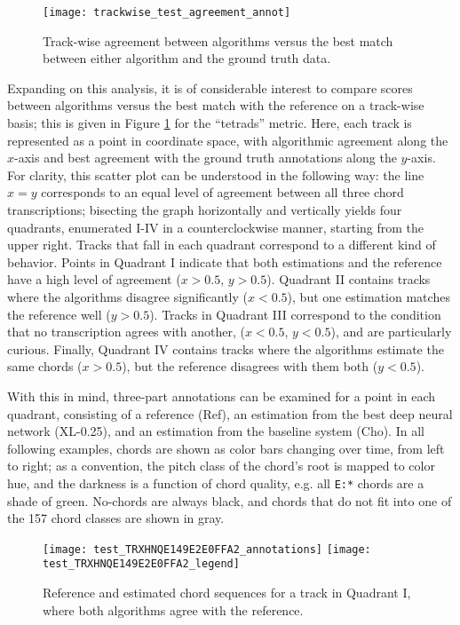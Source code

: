 \begin{figure}[t!]
\centering
\texttt{[image: trackwise\_test\_agreement\_annot]}
\caption{Track-wise agreement between algorithms versus the best match between either algorithm and the ground truth data.}
\label{fig:trackwise_test_agreement}
\end{figure}


Expanding on this analysis, it is of considerable interest to compare scores between algorithms versus the best match with the reference on a track-wise basis; this is given in Figure \ref{fig:trackwise_test_agreement} for the ``tetrads'' metric.
Here, each track is represented as a point in coordinate space, with algorithmic agreement along the $x$-axis and best agreement with the ground truth annotations along the $y$-axis.
For clarity, this scatter plot can be understood in the following way:
the line $x=y$ corresponds to an equal level of agreement between all three chord transcriptions;
bisecting the graph horizontally and vertically yields four quadrants, enumerated I-IV in a counterclockwise manner, starting from the upper right.
Tracks that fall in each quadrant correspond to a different kind of behavior.
Points in Quadrant I indicate that both estimations and the reference have a high level of agreement ($x > 0.5$, $y > 0.5$).
Quadrant II contains tracks where the algorithms disagree significantly ($x < 0.5$), but one estimation matches the reference well ($y > 0.5$).
Tracks in Quadrant III correspond to the condition that no transcription agrees with another, ($x < 0.5$, $y < 0.5$), and are particularly curious.
Finally, Quadrant IV contains tracks where the algorithms estimate the same chords ($x > 0.5$), but the reference disagrees with them both ($y < 0.5$).

With this in mind, three-part annotations can be examined for a point in each quadrant, consisting of a reference (Ref), an estimation from the best deep neural network (XL-0.25), and an estimation from the baseline system (Cho).
In all following examples, chords are shown as color bars changing over time, from left to right;
as a convention, the pitch class of the chord's root is mapped to color hue, and the darkness is a function of chord quality, e.g. all \texttt{E:*} chords are a shade of green.
No-chords are always black, and chords that do not fit into one of the 157 chord classes are shown in gray.

\begin{figure}[t!]
\centering
\texttt{[image: test\_TRXHNQE149E2E0FFA2\_annotations]}
\texttt{[image: test\_TRXHNQE149E2E0FFA2\_legend]}
\caption{Reference and estimated chord sequences for a track in Quadrant I, where both algorithms agree with the reference.}
\label{fig:test_quadI}
\end{figure}

